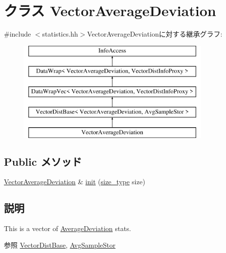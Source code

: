 \hypertarget{classStats_1_1VectorAverageDeviation}{
\section{クラス VectorAverageDeviation}
\label{classStats_1_1VectorAverageDeviation}
}


{\ttfamily \#include $<$statistics.hh$>$}VectorAverageDeviationに対する継承グラフ:\begin{figure}[H]
\begin{center}
\leavevmode
\includegraphics[height=5cm]{classStats_1_1VectorAverageDeviation}
\end{center}
\end{figure}
\subsection*{Public メソッド}
\begin{DoxyCompactItemize}
\item 
\hyperlink{classStats_1_1VectorAverageDeviation}{VectorAverageDeviation} \& \hyperlink{classStats_1_1VectorAverageDeviation_ab861adc13eb968124467314d8d2ab8eb}{init} (\hyperlink{namespaceStats_ada51e68d31936547d3729c82daf6b7c6}{size\_\-type} size)
\end{DoxyCompactItemize}


\subsection{説明}
This is a vector of \hyperlink{classStats_1_1AverageDeviation}{AverageDeviation} stats. \begin{DoxySeeAlso}{参照}
\hyperlink{classStats_1_1VectorDistBase}{VectorDistBase}, \hyperlink{classStats_1_1AvgSampleStor}{AvgSampleStor} 
\end{DoxySeeAlso}


